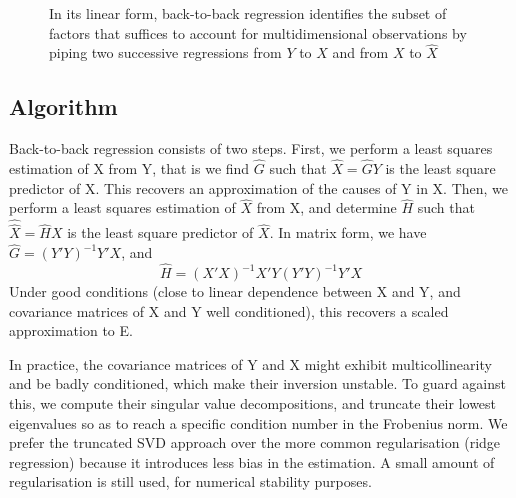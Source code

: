 \documentclass{article}
\begin{document}
\begin{figure}[t!]
    \caption{In its linear form, back-to-back regression identifies the subset of factors that suffices to account for multidimensional observations by piping two successive regressions from $Y$ to $X$ and from $X$ to $\hat X$}
    \label{fig:}
\end{figure}


\subsection{Algorithm}

Back-to-back regression consists of two steps.
%
First, we perform a least squares estimation of X from Y, that is we find $\hat G$ such that $\hat X=\hat G Y$ is the least square predictor of X.
%
This recovers an approximation of the causes of Y in X.
%
Then, we perform a least squares estimation of $\hat X$ from X, and determine $\hat H$ such that $\hat {\hat X}=\hat H X$ is the least square predictor of $\hat X$.
%
In matrix form, we have $\hat G=(Y'Y)^{-1} Y'X$, and
\begin{equation} \hat H=(X'X)^{-1} X'Y(Y'Y)^{-1} Y'X\end{equation}
Under good conditions (close to linear dependence between X and Y, and covariance matrices of X and Y well conditioned), this recovers a scaled approximation to E.

In practice, the covariance matrices of Y and X might exhibit multicollinearity and be badly conditioned, which make their inversion unstable. To guard against this, we compute their singular value decompositions, and truncate their lowest eigenvalues so as to reach a specific condition number in the Frobenius norm. We prefer the truncated SVD approach over the more common regularisation (ridge regression) because it introduces less bias in the estimation. A small amount of regularisation is still used, for numerical stability purposes.
\end{document}
